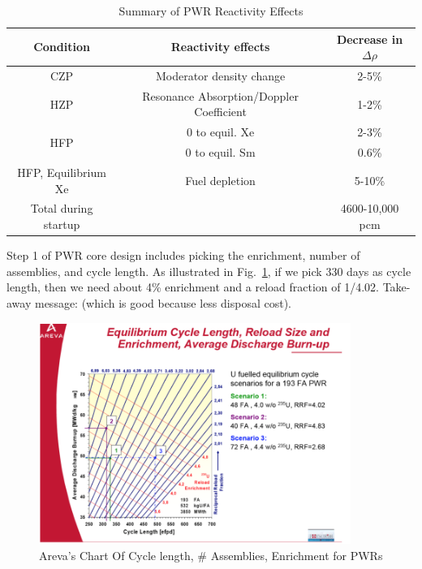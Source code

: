 \documentclass{school-22.211-notes}
\begin{document}
\begin{table}[ht]
  \centering
  \begin{tabular}{c|c|c} \hline
    Condition & Reactivity effects & Decrease in $\Delta \rho$ \\ \hline
    CZP & Moderator density change & 2-5\% \\ \hline
    HZP & Resonance Absorption/Doppler Coefficient & 1-2\% \\ \hline
    \multirow{2}{*}{HFP} & 0 to equil. Xe & 2-3\% \\ 
    & 0 to equil. Sm & 0.6\% \\ \hline
    HFP, Equilibrium Xe & Fuel depletion & 5-10\% \\ \hline \hline
    Total during startup &   & 4600-10,000 pcm \\ \hline
  \end{tabular}
  \caption{Summary of PWR Reactivity Effects} \label{PWR-reactivity}
\end{table}

\clearpage
{}
Step 1 of PWR core design includes picking the enrichment, number of assemblies, and cycle length. As illustrated in Fig.~\ref{areva-lattice-design}, if we pick 330 days as cycle length, then we need about 4\% enrichment and a reload fraction of 1/4.02. Take-away message:  (which is good because less disposal cost). 

  \begin{figure}[ht]
    \centering
    \includegraphics[width=4in]{images/design/areva-lattice-design.png}
    \caption{Areva's Chart Of Cycle length, \# Assemblies, Enrichment for PWRs} \label{areva-lattice-design}
  \end{figure}
\end{document}
